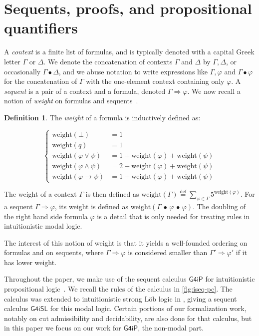 \documentclass[english,review]{jflart}
\theoremstyle{definition}
\newtheorem{definition}{Definition}
\theoremstyle{plain}
\renewcommand{\phi}{\varphi}
\newcommand{\weight}{\text{weight}}
\newcommand{\Gfourip}{\mathsf{G4iP}}
\newcommand{\Gfourisl}{\mathsf{G4iSL}}
\newcommand{\isdef}{\stackrel{\mathrm{def}}{=}}
\newcommand{\cons}{\,\bullet\,}
\begin{document}
\section{Sequents, proofs, and propositional quantifiers}\label{sec:prelims}
A \emph{context} is a finite list of formulas, and is typically denoted with a capital Greek letter $\Gamma$ or $\Delta$. We denote the concatenation of contexts $\Gamma$ and $\Delta$ by $\Gamma, \Delta$, or occasionally $\Gamma \bullet \Delta$, and we abuse notation to write expressions like $\Gamma, \phi$ and $\Gamma \bullet \phi$ for the concatenation of $\Gamma$ with the one-element context containing only $\phi$. A \emph{sequent} is a pair of a context and a formula, denoted $\Gamma \Rightarrow \phi$. We now recall a notion of \emph{weight} on formulas and sequents~\cite{Pit1992}.
\begin{definition}\label{dfn:weight}
    The \emph{weight} of a formula is inductively defined as:

$$\left\{
\begin{array}{rl}
      \weight(\bot) &= 1 \\
      \weight(q) &= 1 \\
      \weight(\phi \lor \psi) &= 1 + \weight (\phi) + \weight (\psi) \\
      \weight(\phi \land \psi) &= 2 + \weight (\phi) + \weight (\psi) \\
      \weight(\phi \rightarrow \psi) &= 1 + \weight (\phi) + \weight (\psi)
\end{array}
\right.$$

The weight of a context $\Gamma$ is then defined as $\weight(\Gamma) \isdef \sum_{\phi \in \Gamma} 5^{\weight(\phi)}$. For a sequent $\Gamma \Rightarrow \phi$, its weight is defined as $\weight(\Gamma \cons \phi \cons \phi)$. The doubling of the right hand side formula $\phi$ is a detail that is only needed for treating rules in intuitionistic modal logic.
\end{definition}
The interest of this notion of weight is that it yields a well-founded ordering on formulas and on sequents, where $\Gamma \Rightarrow \phi$ is considered smaller than $\Gamma' \Rightarrow \phi'$ if it has lower weight.

Throughout the paper, we make use of the sequent calculus $\Gfourip$ for intuitionistic propositional logic~\cite{Vor1952,Hud1988,Dyc1992}. We recall the rules of the calculus in \cref{fig:iseq-pc}. The calculus was extended to intuitionistic strong Löb logic in \cite{Shillito23}, giving a sequent calculus $\Gfourisl$ for this modal logic. Certain portions of our formalization work, notably on cut admissibility and decidability, are also done for that calculus, but in this paper we focus on our work for $\Gfourip$, the non-modal part.
\end{document}
